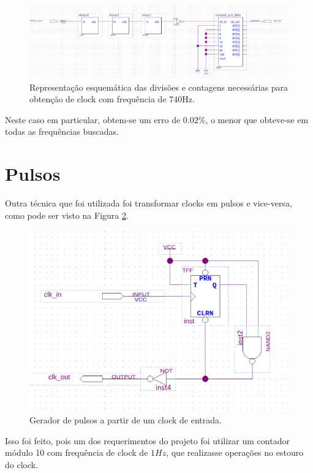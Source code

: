\begin{figure}[H]
	\centering
	\includegraphics[width=1\columnwidth]{FIGURAS/cap_2/freq_740hz.png}
	\caption{Representação esquemática das divisões e contagens necessárias para obtenção de clock com frequência de 740Hz.}
        \label{fig:2.12}
\end{figure}



Neste caso em particular, obtem-se um erro de $0.02\%$, o menor que obteve-se em todas as frequências buscadas.

\section{Pulsos}

Outra técnica que foi utilizada foi transformar clocks em pulsos e vice-versa, como pode ser visto na Figura \ref{fig:2.13}.

\begin{figure}[H]
	\centering
	\includegraphics[width=1\columnwidth]{FIGURAS/cap_2/pulsos.png}
	\caption{Gerador de pulsos a partir de um clock de entrada.}
        \label{fig:2.13}
\end{figure}




Isso foi feito, pois um dos requerimentos do projeto foi utilizar um contador módulo 10 com frequência de clock de $1Hz$, que realizasse operações no estouro do clock.

